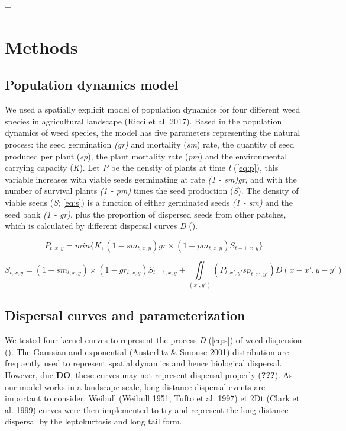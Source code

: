 +\documentclass[12pt]{article}
\begin{document}
\section{Methods}\label{methods}

\subsection{Population dynamics model}\label{population-dynamics-model}

We used a spatially explicit model of population dynamics for four
different weed species in agricultural landscape (Ricci et al. 2017).
Based in the population dynamics of weed species, the model has five
parameters representing the natural process: the seed germination
\emph{(gr)} and mortality (\emph{sm}) rate, the quantity of seed
produced per plant (\emph{sp}), the plant mortality rate (\emph{pm}) and
the environmental carrying capacity (\emph{K}). Let \emph{P} be the
density of plants at time \emph{t} (\cref{eq:p}), this
variable increases with viable seeds germinating at rate \emph{(1 -
sm)gr}, and with the number of survival plants \emph{(1 - pm)} times the
seed production (\emph{S}). The density of viable seeds (\emph{S};
\cref{eq:s}) is a function of either germinated seeds
\emph{(1 - sm)} and the seed bank \emph{(1 - gr)}, plus the proportion
of dispersed seeds from other patches, which is calculated by different
dispersal curves \emph{D} ().

\begin{equation} P_{t,x,y} = min\{K,(1 - sm_{t,x,y})gr\times(1 - pm_{t,x,y})S_{t-1,x,y}\} \label{eq:p}\end{equation}

\begin{equation} S_{t,x,y} = (1 - sm_{t,x,y})\times(1 - gr_{t,x,y})S_{t-1,x,y} + \iint\limits_{(x',y')} (P_{t,x',y'}sp_{t,x',y'})D(x - x', y - y') \label{eq:s}\end{equation}

\subsection{Dispersal curves and
parameterization}\label{dispersal-curves-and-parameterization}

We tested four kernel curves to represent the process \emph{D}
(\cref{eq:s}) of weed dispersion
(). The Gaussian and exponential
(Austerlitz \& Smouse 2001) distribution are frequently used to
represent spatial dynamics and hence biological dispersal. However, due
\textbf{DO}, these curves may not represent dispersal properly
({\textbf{???}}). As our model works in a landscape scale, long distance
dispersal events are important to consider. Weibull (Weibull 1951; Tufto
et al. 1997) et 2Dt (Clark et al. 1999) curves were then implemented to
try and represent the long distance dispersal by the leptokurtosis and
long tail form.
\end{document}
